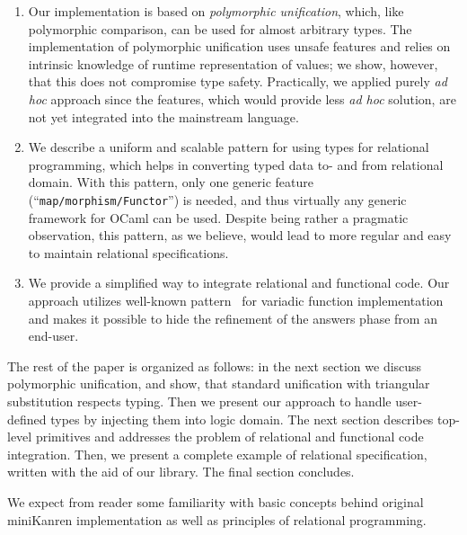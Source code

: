 \begin{enumerate}
\item Our implementation is based on \emph{polymorphic unification}, which, like polymorphic comparison,
can be used for almost arbitrary types. The implementation of polymorphic unification uses unsafe features and
relies on intrinsic knowledge of runtime representation of values; we show, however, that this does not
compromise type safety. Practically, we applied purely \emph{ad hoc} approach since the features, 
which would provide less \emph{ad hoc} solution, are not yet integrated into the mainstream language.

\item We describe a uniform and scalable pattern for using types for relational programming, which
helps in converting typed data to- and from relational domain. With this pattern, only one
generic feature (``\lstinline{map/morphism/Functor}'') is needed, and thus virtually any generic 
framework for OCaml can be used. Despite being rather a pragmatic observation, this pattern, as we
believe, would lead to  more regular and easy to maintain relational specifications.

\item We provide a simplified way to integrate relational and functional code. Our approach utilizes
well-known pattern~\cite{Unparsing, DoWeNeed} for variadic function implementation and makes it
possible to hide the refinement of the answers phase from an end-user.
\end{enumerate}

The rest of the paper is organized as follows: in the next section we discuss polymorphic
unification, and show, that standard unification with triangular substitution respects
typing. Then we present our approach to handle user-defined types by injecting them 
into logic domain. The next section describes top-level primitives and addresses the problem of
relational and functional code integration. Then, we present a complete example of relational
specification, written with the aid of our library. The final section concludes.

We expect from reader some familiarity with basic concepts behind original miniKanren 
implementation as well as principles of relational programming.

